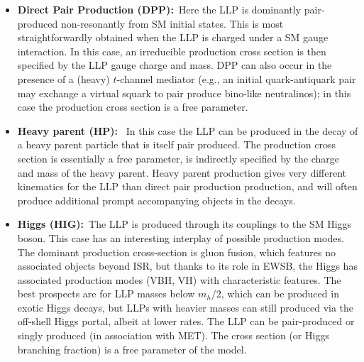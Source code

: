 %
\begin{itemize}

\item {\bf Direct Pair Production (DPP):}~Here the LLP is dominantly pair-produced non-resonantly from SM initial states.  This is most straightforwardly obtained when the LLP is charged under a SM gauge interaction.  
In this case, an irreducible production cross section is then specified by the LLP gauge charge and mass.  DPP can also occur in the presence of a (heavy) $t$-channel mediator (e.g., an initial quark-antiquark pair may exchange a virtual squark to pair produce bino-like neutralinos); in this case the production cross section is a free parameter.

\item {\bf Heavy parent (HP):}~ In this case the LLP can be produced in the decay of a heavy parent particle that is itself pair produced. The production cross section is essentially a free parameter, is indirectly specified by the charge and mass of the heavy parent. Heavy parent production gives very different kinematics for the LLP than direct pair production production, and will often produce additional prompt accompanying objects in the decays.

\item {\bf Higgs (HIG):}~The LLP is produced through its couplings to the SM Higgs boson.  This case has an interesting interplay of possible production modes. The dominant production cross-section is  gluon fusion, which features no associated objects beyond ISR, but thanks to its role in EWSB, the Higgs has associated production modes (VBH, VH) with characteristic features. The best prospects are for LLP masses below $m_h/2$, which can be produced in exotic Higgs decays, but LLPs with heavier masses can still produced via the off-shell Higgs portal, albeit at lower rates. The LLP can be pair-produced or singly produced (in association with MET). The cross section (or Higgs branching fraction) is a free parameter of the model.



\end{itemize}
